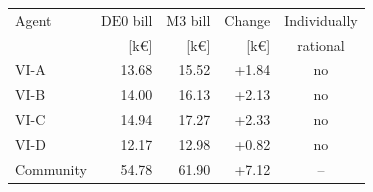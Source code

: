 \begin{tabular*}{\textwidth}{@{\extracolsep{\fill}}lrrrc@{}}
\toprule
Agent & $\mathrm{DE0}$ bill & $\mathrm{M3}$ bill & Change & Individually \\
 & [k\euro] & [k\euro] & [k\euro] & rational \\
\midrule
VI-A & 13.68 & 15.52 & +1.84 & no \\
VI-B & 14.00 & 16.13 & +2.13 & no \\
VI-C & 14.94 & 17.27 & +2.33 & no \\
VI-D & 12.17 & 12.98 & +0.82 & no \\
\midrule
Community & 54.78 & 61.90 & +7.12 & -- \\
\bottomrule
\end{tabular*}
